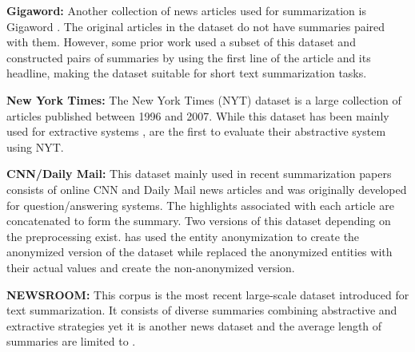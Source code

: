 \documentclass[11pt,a4paper]{article}
\begin{document}
\noindent\textbf{Gigaword:} Another collection of news articles used for summarization is Gigaword \cite{napoles2012annotated}. The original articles in the dataset do not have summaries paired with them. However, some prior work \cite{rush2015neural,chopra2016abstractive} used a subset of this dataset and constructed pairs of summaries by using the first line of the article and its headline, making the dataset suitable for short text summarization tasks.

\noindent\textbf{New York Times:} The New York Times (NYT) dataset \cite{sandhaus2008new} is a large collection of articles published between 1996 and 2007. While this dataset has been mainly used for extractive systems \cite{hong2014improving,durrett2016learning}, \citet{paulus2017deep} are the first to evaluate their abstractive system using NYT.

\noindent\textbf {CNN/Daily Mail:} This dataset mainly used in recent summarization papers ~\cite{nallapati2016abstractive,see2017get,nallapati2017summarunner} consists of online CNN and Daily Mail news articles and was originally developed for question/answering systems. The highlights associated with each article are concatenated to form the summary. Two versions of this dataset depending on the preprocessing exist. \citet{nallapati2017summarunner} has used the entity anonymization to create the anonymized version of the dataset while \citet{see2017get} replaced the anonymized entities with their actual values and create the non-anonymized version.


\noindent\textbf {NEWSROOM:} This corpus \cite{grusky2018newsroom} is the most recent large-scale dataset introduced for text summarization. It consists of diverse summaries combining abstractive and extractive strategies yet it is another news dataset and the average length of summaries are limited to .
\end{document}
